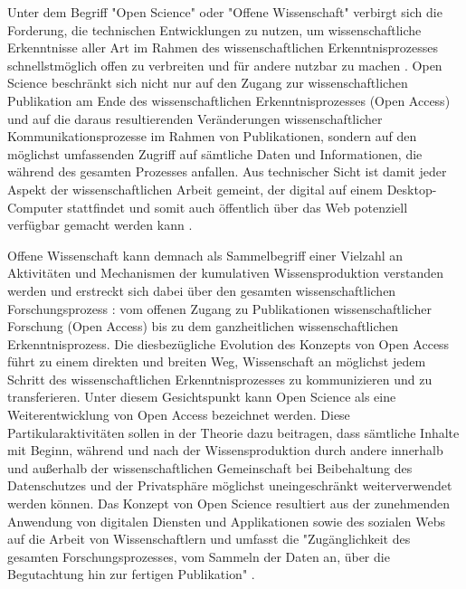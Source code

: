 Unter dem Begriff "Open Science" oder "Offene Wissenschaft" verbirgt sich die Forderung, die technischen Entwicklungen zu nutzen, um wissenschaftliche Erkenntnisse aller Art im Rahmen des wissenschaftlichen Erkenntnisprozesses schnellstmöglich offen zu verbreiten und für andere nutzbar zu machen \cite{Stafford_2010}. Open Science beschränkt sich nicht nur auf den Zugang zur wissenschaftlichen Publikation am Ende des wissenschaftlichen Erkenntnisprozesses (Open Access) und auf die daraus resultierenden Veränderungen wissenschaftlicher Kommunikationsprozesse im Rahmen von Publikationen, sondern auf den möglichst umfassenden Zugriff auf sämtliche Daten und Informationen, die während des gesamten Prozesses anfallen. Aus technischer Sicht ist damit jeder Aspekt der wissenschaftlichen Arbeit gemeint, der digital auf einem Desktop-Computer stattfindet und somit auch öffentlich über das Web potenziell verfügbar gemacht werden kann \cite{Mietchen_2012}.

Offene Wissenschaft kann demnach als Sammelbegriff einer Vielzahl an Aktivitäten und Mechanismen der kumulativen Wissensproduktion verstanden werden \cite{Mukherjee_2009} und erstreckt sich dabei über den gesamten wissenschaftlichen Forschungsprozess \cite{Scheliga_2014}: vom offenen Zugang zu Publikationen wissenschaftlicher Forschung (Open Access) bis zu dem ganzheitlichen wissenschaftlichen Erkenntnisprozess. Die diesbezügliche Evolution des Konzepts von Open Access führt zu einem direkten und breiten Weg, Wissenschaft an möglichst jedem Schritt des wissenschaftlichen Erkenntnisprozesses zu kommunizieren und zu transferieren. Unter diesem Gesichtspunkt kann Open Science als eine Weiterentwicklung von Open Access bezeichnet werden. Diese Partikularaktivitäten sollen in der Theorie dazu beitragen, dass sämtliche Inhalte mit Beginn, während und nach der Wissensproduktion durch andere innerhalb und außerhalb der wissenschaftlichen Gemeinschaft bei Beibehaltung des Datenschutzes und der Privatsphäre möglichst uneingeschränkt weiterverwendet werden können. Das Konzept von Open Science resultiert aus der zunehmenden Anwendung von digitalen Diensten und Applikationen sowie des sozialen Webs auf die Arbeit von Wissenschaftlern und umfasst die "Zugänglichkeit des gesamten Forschungsprozesses, vom Sammeln der Daten an, über die Begutachtung hin zur fertigen Publikation" \cite{Brembs_2015}.


